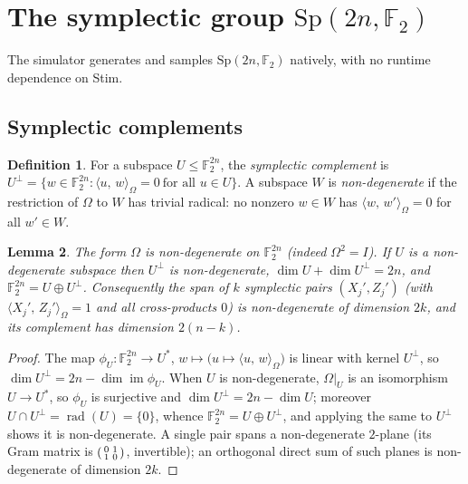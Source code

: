 \documentclass[11pt]{article}
\theoremstyle{definition}
\newtheorem{definition}{Definition}[section]
\theoremstyle{plain}
\newtheorem{lemma}[definition]{Lemma}
\newcommand{\F}{\mathbb{F}}
\newcommand{\Sp}{\mathrm{Sp}}
\newcommand{\sympprod}[2]{\langle #1,\, #2\rangle_{\Omega}}
\begin{document}
\section{The symplectic group \texorpdfstring{$\Sp(2n,\F_2)$}{Sp(2n,F2)}}
\label{sec:spgroup}

The simulator generates and samples $\Sp(2n,\F_2)$ natively, with no runtime
dependence on Stim.

\subsection{Symplectic complements}
\begin{definition}
For a subspace $U\le\F_2^{2n}$, the \emph{symplectic complement} is
$U^{\perp}=\{w\in\F_2^{2n}:\sympprod{u}{w}=0\ \text{for all }u\in U\}$. A
subspace $W$ is \emph{non-degenerate} if the restriction of $\Omega$ to $W$ has
trivial radical: no nonzero $w\in W$ has $\sympprod{w}{w'}=0$ for all $w'\in W$.
\end{definition}
\begin{lemma}
\label{lem:complement}
The form $\Omega$ is non-degenerate on $\F_2^{2n}$ (indeed $\Omega^2=I$). If
$U$ is a non-degenerate subspace then $U^{\perp}$ is non-degenerate,
$\dim U+\dim U^{\perp}=2n$, and $\F_2^{2n}=U\oplus U^{\perp}$. Consequently the
span of $k$ symplectic pairs $(X_j',Z_j')$ (with $\sympprod{X_j'}{Z_j'}=1$ and
all cross-products $0$) is non-degenerate of dimension $2k$, and its complement
has dimension $2(n-k)$.
\end{lemma}
\begin{proof}
The map $\phi_U:\F_2^{2n}\to U^{*}$, $w\mapsto\bigl(u\mapsto\sympprod{u}{w}\bigr)$
is linear with kernel $U^{\perp}$, so $\dim U^{\perp}=2n-\dim\operatorname{im}\phi_U$.
When $U$ is non-degenerate, $\Omega|_U$ is an isomorphism $U\to U^{*}$, so
$\phi_U$ is surjective and $\dim U^{\perp}=2n-\dim U$; moreover
$U\cap U^{\perp}=\operatorname{rad}(U)=\{0\}$, whence $\F_2^{2n}=U\oplus U^{\perp}$,
and applying the same to $U^{\perp}$ shows it is non-degenerate. A single pair
spans a non-degenerate $2$-plane (its Gram matrix is
$\begin{psmallmatrix}0&1\\1&0\end{psmallmatrix}$, invertible); an orthogonal
direct sum of such planes is non-degenerate of dimension $2k$.
\end{proof}
\end{document}
